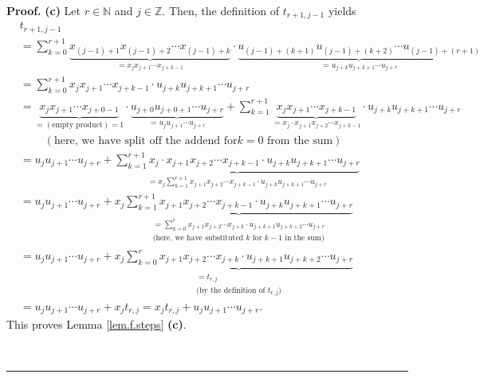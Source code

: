 \documentclass[numbers=enddot,12pt,final,onecolumn,notitlepage]{scrartcl}%
\theoremstyle{definition}
\newenvironment{proof}[1][Proof]{\noindent\textbf{#1.} }{\ \rule{0.5em}{0.5em}}
\let\sumnonlimits\sum
\renewcommand{\sum}{\sumnonlimits\limits}
\newenvironment{verlong}{}{}
\begin{document}
\begin{proof}
\begin{verlong}
\textbf{(c)} Let $r\in\mathbb{N}$ and $j\in\mathbb{Z}$. Then, the definition
of $t_{r+1,j-1}$ yields%
\begin{align*}
&  t_{r+1,j-1}\\
&  =\sum_{k=0}^{r+1}\underbrace{x_{\left(  j-1\right)  +1}x_{\left(
j-1\right)  +2}\cdots x_{\left(  j-1\right)  +k}}_{=x_{j}x_{j+1}\cdots
x_{j+k-1}}\cdot\underbrace{u_{\left(  j-1\right)  +\left(  k+1\right)
}u_{\left(  j-1\right)  +\left(  k+2\right)  }\cdots u_{\left(  j-1\right)
+\left(  r+1\right)  }}_{=u_{j+k}u_{j+k+1}\cdots u_{j+r}}\\
&  =\sum_{k=0}^{r+1}x_{j}x_{j+1}\cdots x_{j+k-1}\cdot u_{j+k}u_{j+k+1}\cdots
u_{j+r}\\
&  =\underbrace{x_{j}x_{j+1}\cdots x_{j+0-1}}_{=\left(  \text{empty
product}\right)  =1}\cdot\underbrace{u_{j+0}u_{j+0+1}\cdots u_{j+r}}%
_{=u_{j}u_{j+1}\cdots u_{j+r}}+\sum_{k=1}^{r+1}\underbrace{x_{j}x_{j+1}\cdots
x_{j+k-1}}_{=x_{j}\cdot x_{j+1}x_{j+2}\cdots x_{j+k-1}}\cdot u_{j+k}%
u_{j+k+1}\cdots u_{j+r}\\
&  \ \ \ \ \ \ \ \ \ \ \left(  \text{here, we have split off the addend for
}k=0\text{ from the sum}\right) \\
&  =u_{j}u_{j+1}\cdots u_{j+r}+\underbrace{\sum_{k=1}^{r+1}x_{j}\cdot
x_{j+1}x_{j+2}\cdots x_{j+k-1}\cdot u_{j+k}u_{j+k+1}\cdots u_{j+r}}%
_{=x_{j}\sum_{k=1}^{r+1}x_{j+1}x_{j+2}\cdots x_{j+k-1}\cdot u_{j+k}%
u_{j+k+1}\cdots u_{j+r}}\\
&  =u_{j}u_{j+1}\cdots u_{j+r}+x_{j}\underbrace{\sum_{k=1}^{r+1}x_{j+1}%
x_{j+2}\cdots x_{j+k-1}\cdot u_{j+k}u_{j+k+1}\cdots u_{j+r}}_{\substack{=\sum
_{k=0}^{r}x_{j+1}x_{j+2}\cdots x_{j+k}\cdot u_{j+k+1}u_{j+k+2}\cdots
u_{j+r}\\\text{(here, we have substituted }k\text{ for }k-1\text{ in the
sum)}}}\\
&  =u_{j}u_{j+1}\cdots u_{j+r}+x_{j}\underbrace{\sum_{k=0}^{r}x_{j+1}%
x_{j+2}\cdots x_{j+k}\cdot u_{j+k+1}u_{j+k+2}\cdots u_{j+r}}%
_{\substack{=t_{r,j}\\\text{(by the definition of }t_{r,j}\text{)}}}\\
&  =u_{j}u_{j+1}\cdots u_{j+r}+x_{j}t_{r,j}=x_{j}t_{r,j}+u_{j}u_{j+1}\cdots
u_{j+r}.
\end{align*}
This proves Lemma \ref{lem.f.steps} \textbf{(c)}.
\end{verlong}


\end{proof}
\end{document}
